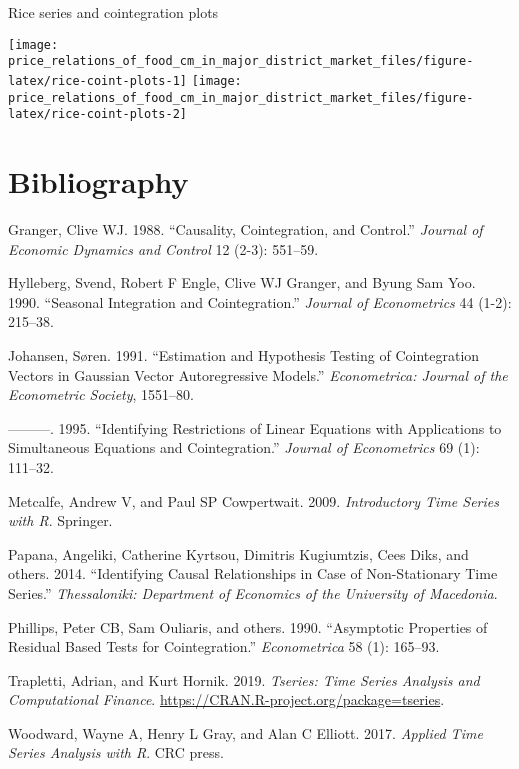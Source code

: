 \documentclass[
  12pt,
]{article}
\begin{document}
Rice series and cointegration plots

\begin{center}\texttt{[image: price\_relations\_of\_food\_cm\_in\_major\_district\_market\_files/figure-latex/rice-coint-plots-1]} \texttt{[image: price\_relations\_of\_food\_cm\_in\_major\_district\_market\_files/figure-latex/rice-coint-plots-2]} \end{center}

\hypertarget{bibliography}{%
\section*{Bibliography}\label{bibliography}}

\hypertarget{refs}{}
\leavevmode\hypertarget{ref-granger1988causality}{}%
Granger, Clive WJ. 1988. ``Causality, Cointegration, and Control.'' \emph{Journal of Economic Dynamics and Control} 12 (2-3): 551--59.

\leavevmode\hypertarget{ref-hylleberg1990seasonal}{}%
Hylleberg, Svend, Robert F Engle, Clive WJ Granger, and Byung Sam Yoo. 1990. ``Seasonal Integration and Cointegration.'' \emph{Journal of Econometrics} 44 (1-2): 215--38.

\leavevmode\hypertarget{ref-johansen1991estimation}{}%
Johansen, Søren. 1991. ``Estimation and Hypothesis Testing of Cointegration Vectors in Gaussian Vector Autoregressive Models.'' \emph{Econometrica: Journal of the Econometric Society}, 1551--80.

\leavevmode\hypertarget{ref-johansen1995identifying}{}%
---------. 1995. ``Identifying Restrictions of Linear Equations with Applications to Simultaneous Equations and Cointegration.'' \emph{Journal of Econometrics} 69 (1): 111--32.

\leavevmode\hypertarget{ref-metcalfe2009introductory}{}%
Metcalfe, Andrew V, and Paul SP Cowpertwait. 2009. \emph{Introductory Time Series with R}. Springer.

\leavevmode\hypertarget{ref-papana2014identifying}{}%
Papana, Angeliki, Catherine Kyrtsou, Dimitris Kugiumtzis, Cees Diks, and others. 2014. ``Identifying Causal Relationships in Case of Non-Stationary Time Series.'' \emph{Thessaloniki: Department of Economics of the University of Macedonia}.

\leavevmode\hypertarget{ref-phillips1990asymptotic}{}%
Phillips, Peter CB, Sam Ouliaris, and others. 1990. ``Asymptotic Properties of Residual Based Tests for Cointegration.'' \emph{Econometrica} 58 (1): 165--93.

\leavevmode\hypertarget{ref-R-tseries}{}%
Trapletti, Adrian, and Kurt Hornik. 2019. \emph{Tseries: Time Series Analysis and Computational Finance}. \url{https://CRAN.R-project.org/package=tseries}.

\leavevmode\hypertarget{ref-woodward2017applied}{}%
Woodward, Wayne A, Henry L Gray, and Alan C Elliott. 2017. \emph{Applied Time Series Analysis with R}. CRC press.
\end{document}
